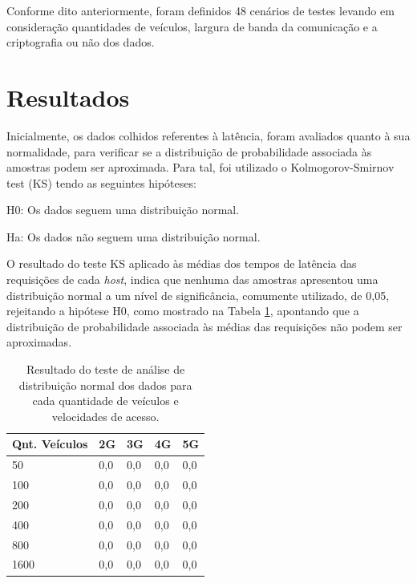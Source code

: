 \documentclass[
	12pt,				%
	oneside,			%
	a4paper,			%
	english,			%
	brazil				%
	]{abntex2ppgsi}
\begin{document}
Conforme dito anteriormente, foram definidos 48 cenários de testes levando em consideração quantidades de veículos, largura de banda da comunicação e a criptografia ou não dos dados.


\section{Resultados}

Inicialmente, os dados colhidos referentes à latência, foram avaliados quanto à sua normalidade, para verificar se a distribuição de probabilidade associada às amostras podem ser aproximada. Para tal, foi utilizado o Kolmogorov-Smirnov test (KS) tendo as seguintes hipóteses:

H0: Os dados seguem uma distribuição normal.

Ha: Os dados não seguem uma distribuição normal.

O resultado do teste KS aplicado às médias dos tempos de latência das requisições de cada \textit{host}, indica que nenhuma das amostras apresentou uma distribuição normal a um nível de significância, comumente utilizado, de 0,05, rejeitando a hipótese H0, como mostrado na Tabela \ref{tbEstatisticaKS}, apontando que a distribuição de probabilidade associada às médias das requisições não podem ser aproximadas.

\begin{table}[!h]
	\centering
	\caption{Resultado do teste de análise de distribuição normal dos dados para cada quantidade de veículos e velocidades de acesso. }
	\label{tbEstatisticaKS}
	\begin{tabular}{|p{4.0cm}|p{2.0cm}|p{2.0cm}|p{2.0cm}|p{2.0cm}|}
		\hline
		\rowcolor[gray]{0.7}
		Qnt. Veículos & 2G  & 3G  & 4G  & 5G  \\ \hline
		\cellcolor[gray]{0.7}50              & 0,0 & 0,0 & 0,0 & 0,0 \\ \hline
		\cellcolor[gray]{0.7}100             & 0,0 & 0,0 & 0,0 & 0,0 \\ \hline
		\cellcolor[gray]{0.7}200             & 0,0 & 0,0 & 0,0 & 0,0 \\ \hline
		\cellcolor[gray]{0.7}400             & 0,0 & 0,0 & 0,0 & 0,0 \\ \hline
		\cellcolor[gray]{0.7}800             & 0,0 & 0,0 & 0,0 & 0,0 \\ \hline
		\cellcolor[gray]{0.7}1600            & 0,0 & 0,0 & 0,0 & 0,0 \\ \hline
	\end{tabular}
\end{table}
\end{document}
